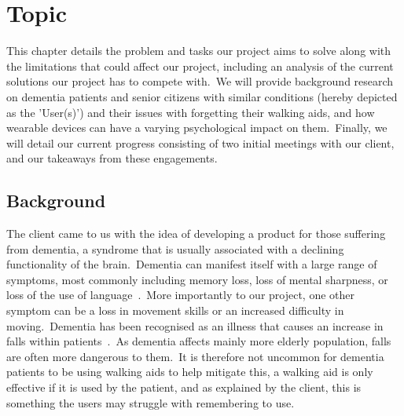 \chapter{Topic} \label{ch:topic}

    This chapter details the problem and tasks our project aims to solve along with the limitations that could affect
    our project, including an analysis of the current solutions our project has to compete with.\ We will provide
    background research on dementia patients and senior citizens with similar conditions (hereby depicted as the
    'User(s)') and their issues with forgetting their walking aids, and how wearable devices can have a varying
    psychological impact on them.\ Finally, we will detail our current progress consisting of two initial meetings
    with our client, and our takeaways from these engagements.

    \section{Background}

        The client came to us with the idea of developing a product for those suffering from dementia, a syndrome that
        is usually associated with a declining functionality of the brain.\ Dementia can manifest itself with a large
        range of symptoms, most commonly including memory loss, loss of mental sharpness, or loss of the use of
        language~\cite{nhs_choices}.\ More importantly to our project, one other symptom can be a loss in movement
        skills or an increased difficulty in moving.\ Dementia has been recognised as an illness that causes an
        increase in falls within
        patients~\cite{doorn_gruber-baldini_zimmerman_hebel_port_baumgarten_quinn_taler_may_magaziner_et_al._2003}.\ As
        dementia affects mainly more elderly population, falls are often more dangerous to them.\ It is therefore not
        uncommon for dementia patients to be using walking aids to help mitigate this, a walking aid is only effective
        if it is used by the patient, and as explained by the client, this is something the users may struggle with
        remembering to use.

